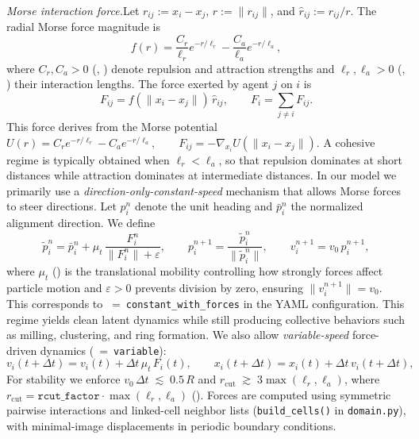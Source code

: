\documentclass{report}
\theoremstyle{plain}
\theoremstyle{remark}
\numberwithin{equation}{section}              %
\begin{document}
\emph{Morse interaction force.}\;Let $r_{ij} := x_i - x_j$, $r := \|r_{ij}\|$, and $\hat r_{ij} := r_{ij}/r$. The radial Morse force magnitude is
\begin{equation}
f(r)
=
\frac{C_r}{\ell_r} e^{-r/\ell_r}
-
\frac{C_a}{\ell_a} e^{-r/\ell_a},
\label{eq:morse_fr}
\end{equation}
where $C_r,C_a>0$ (, ) denote repulsion and attraction strengths and $\ell_r,\ell_a>0$ (, ) their  interaction lengths. The force exerted by agent $j$ on $i$ is
\begin{equation}
F_{ij}
=
f(\|x_i-x_j\|)\,\hat r_{ij},
\qquad
F_i
=
\sum_{j\neq i} F_{ij}.
\label{eq:morse_vector_force}
\end{equation}
This force derives from the Morse potential $U(r)
=
C_r e^{-r/\ell_r}
-
C_a e^{-r/\ell_a},
\qquad
F_{ij} = -\nabla_{x_i} U(\|x_i-x_j\|)$. A cohesive regime is typically obtained when $\ell_r<\ell_a$, so that repulsion dominates at short distances while attraction dominates at intermediate distances. In our model we primarily use a \emph{direction-only-constant-speed} mechanism that allows Morse forces to steer directions. Let $p_i^n$ denote the unit heading and $\bar p_i^n$ the normalized alignment direction. We define
\begin{equation}
\tilde p_i^n
=
\bar p_i^n
+
\mu_t\,\frac{F_i^n}{\|F_i^n\|+\varepsilon},
\qquad
p_i^{n+1}
=
\frac{\tilde p_i^n}{\|\tilde p_i^n\|},
\qquad
v_i^{n+1}
=
v_0\,p_i^{n+1},
\label{eq:direction_only_force_update}
\end{equation}
where $\mu_t$ () is the translational mobility controlling how strongly forces affect particle motion and $\varepsilon>0$ prevents division by zero, ensuring $\|v_i^{n+1}\| = v_0$.
This corresponds to ~=~\texttt{constant\_with\_forces} in the YAML configuration.
This regime yields clean latent dynamics while still producing collective behaviors such as milling, clustering, and ring formation. We also allow \emph{variable-speed} force-driven dynamics (~=~\texttt{variable}): \begin{equation}
v_i(t+\Delta t)
=
v_i(t)
+
\Delta t\,\mu_t\,F_i(t),
\qquad
x_i(t+\Delta t)
=
x_i(t)
+
\Delta t\,v_i(t+\Delta t),
\end{equation}
\noindent For stability  we enforce $v_0\,\Delta t \;\lesssim\; 0.5\,R$ and $r_{\mathrm{cut}} \;\gtrsim\; 3\max(\ell_r,\ell_a)$, where $r_{\mathrm{cut}} = \texttt{rcut\_factor}\cdot\max(\ell_r,\ell_a)$ (). Forces are computed using symmetric pairwise interactions and linked-cell neighbor lists (\texttt{build\_cells()} in \texttt{domain.py}), with minimal-image displacements in periodic boundary conditions.
\end{document}
